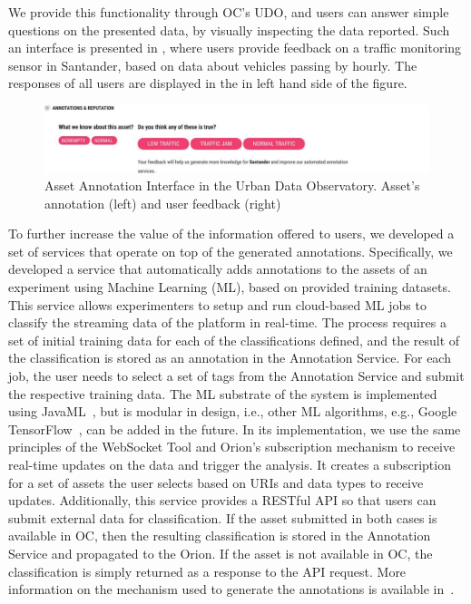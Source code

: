 We provide this functionality through OC's UDO, and users can answer simple questions on the presented data, by visually inspecting the data reported. Such an interface is presented in , where users provide feedback on a traffic monitoring sensor in Santander, based on data about vehicles passing by hourly. The responses of all users are displayed in the in left hand side of the figure.

\begin{figure}
	\centering
	\includegraphics[scale = .3]{figures/annot1}
	\caption{Asset Annotation Interface in the Urban Data Observatory. Asset's annotation (left) and user feedback (right)}
	\label{fig:tags}	
\end{figure}

To further increase the value of the information offered to users, we developed a set of services that operate on top of the generated annotations. %
Specifically, we developed a service that automatically adds annotations to the assets of an experiment using Machine Learning (ML), based on provided training datasets. This service allows experimenters to setup and run cloud-based ML jobs to classify the streaming data of the platform in real-time. The process requires a set of initial training data for each of the classifications defined, and the result of the classification is stored as an annotation in the Annotation Service. For each job, the user needs to select a set of tags from the Annotation Service and submit the respective training data. The ML substrate of the system is implemented using JavaML~\cite{abeel2009java}, but is modular in design, i.e., other ML algorithms, e.g., %
Google TensorFlow~\cite{abadi2016tensorflow}, can be added in the future.
In its implementation, we use the same principles of the WebSocket Tool and Orion's subscription mechanism to receive real-time updates on the data and trigger the analysis. It creates a subscription for a set of assets the user selects based on URIs and data types to receive updates. Additionally, this service provides a RESTful API so that users can submit external data for classification. If the asset submitted in both cases is available in OC, then the resulting classification is stored in the Annotation Service and propagated to the Orion. If the asset is not available in OC, the classification is simply returned as a response to the API request. More information on the mechanism used to generate the annotations is available in~\cite{Jamaica}.

